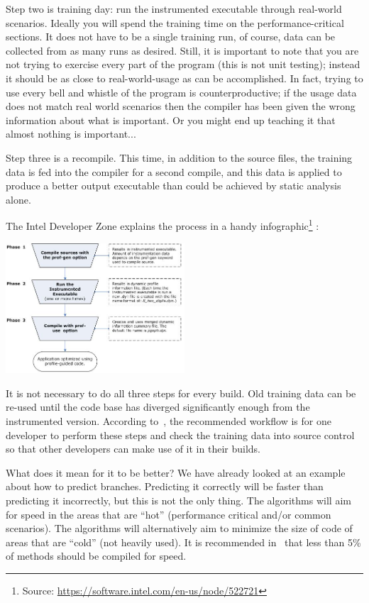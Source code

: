 \documentclass[a4paper]{report}
\begin{document}
Step two is training day: run the instrumented executable through real-world scenarios. Ideally you will spend the training time on the performance-critical sections. It does not have to be a single training run, of course, data can be collected from as many runs as desired.   Still, it is important to note that you are not trying to exercise every part of the program (this is not unit testing); instead it should be as close to real-world-usage as can be accomplished. In fact, trying to use every bell and whistle of the program is counterproductive; if the usage data does not match real world scenarios then  the compiler has been given the wrong information about what is important. Or you might end up teaching it that almost nothing is important...

Step three is a recompile. This time, in addition to the source files, the training data is fed into the compiler for a second compile, and this data is applied to produce a better output executable than could be achieved by static analysis alone.

The Intel Developer Zone explains the process in a handy infographic\footnote{Source: \url{https://software.intel.com/en-us/node/522721}} :

\begin{center}
	\includegraphics[width=0.5\textwidth]{images/pogo-workflow.jpg}
\end{center}

It is not necessary to do all three steps for every build. Old training data can be re-used until the code base has diverged significantly enough from the instrumented version. According to~\cite{pogo}, the recommended workflow is for one developer to perform these steps and check the training data into source control so that other developers can make use of it in their builds.

What does it mean for it to be better? We have already looked at an example about how to predict branches. Predicting it correctly will be faster than predicting it incorrectly, but this is not the only thing.  The algorithms will aim for speed in the areas that are ``hot'' (performance critical and/or common scenarios). The algorithms will alternatively aim to minimize the size of code of areas that are ``cold'' (not heavily used). It is recommended in~\cite{pogo} that less than 5\% of methods should be compiled for speed.
\end{document}
